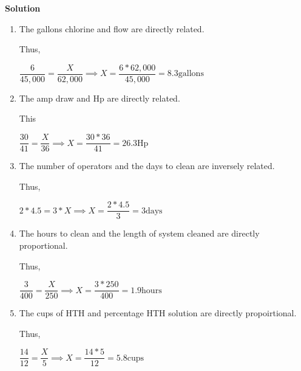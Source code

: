 \documentclass{article}
\begin{document}
\textbf{Solution}
\begin{enumerate}
\item The gallons chlorine and flow are directly related. 

Thus,

$\dfrac{6}{45,000}=\dfrac{X}{62,000} \implies X=\dfrac{6*62,000}{45,000}=8.3 \mathrm{gallons}$


\vspace{0.5cm}

\item The amp draw and Hp are directly related.

This

$\dfrac{30}{41}=\dfrac{X}{36} \implies X=\dfrac{30*36}{41}=26.3 \mathrm{Hp}$

\vspace{0.5cm}

\item The number of operators and the days to clean are inversely related.

Thus,

$2 * 4.5 = 3*X \implies X = \dfrac{2*4.5}{3} = 3 \mathrm{days}$



\vspace{0.5cm}

\item The hours to clean and the length of system cleaned are directly proportional.

Thus,

$\dfrac{3}{400}=\dfrac{X}{250} \implies X=\dfrac{3*250}{400}=1.9 \mathrm{hours}$

\vspace{0.5cm}

\item The cups of HTH and percentage HTH solution are directly propoirtional.

Thus,

$\dfrac{14}{12}=\dfrac{X}{5} \implies X=\dfrac{14*5}{12}=5.8 \mathrm{cups}$


\end{enumerate}
\end{document}
